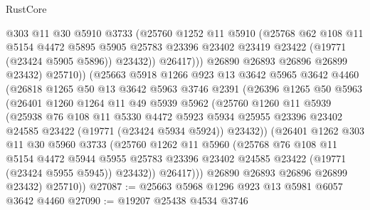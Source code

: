 \begin{lexlean}{RustCore}
\begin{coremodule}
                  @303
                  @11
                  @30
                  @5910
                  @3733
                  (@25760
                    @1252
                    @11
                    @5910
                    (@25768
                      @62
                      @108
                      @11
                      @5154
                      @4472
                      @5895
                      @5905
                      @25783
                      @23396
                      @23402
                      @23419
                      @23422
                      (@19771 (@23424 @5905 @5896))
                      @23432))
                  @26417)))
            @26890
            @26893
            @26896
            @26899
            @23432)
          @25710))
      (@25663
        @5918
        @1266
        @923
        @13
        @3642
        @5965
        @3642
        @4460
        (@26818
          @1265
          @50
          @13
          @3642
          @5963
          @3746
          @2391
          (@26396
            @1265
            @50
            @5963
            (@26401
              @1260
              @1264
              @11
              @49
              @5939
              @5962
              (@25760
                @1260
                @11
                @5939
                (@25938
                  @76
                  @108
                  @11
                  @5330
                  @4472
                  @5923
                  @5934
                  @25955
                  @23396
                  @23402
                  @24585
                  @23422
                  (@19771 (@23424 @5934 @5924))
                  @23432))
              (@26401
                @1262
                @303
                @11
                @30
                @5960
                @3733
                (@25760
                  @1262
                  @11
                  @5960
                  (@25768
                    @76
                    @108
                    @11
                    @5154
                    @4472
                    @5944
                    @5955
                    @25783
                    @23396
                    @23402
                    @24585
                    @23422
                    (@19771 (@23424 @5955 @5945))
                    @23432))
                @26417)))
          @26890
          @26893
          @26896
          @26899
          @23432)
        @25710))
@27087 := @25663 @5968 @1296 @923 @13 @5981 @6057 @3642 @4460
@27090 := @19207 @25438 @4534 @3746

\end{coremodule}
\end{lexlean}
